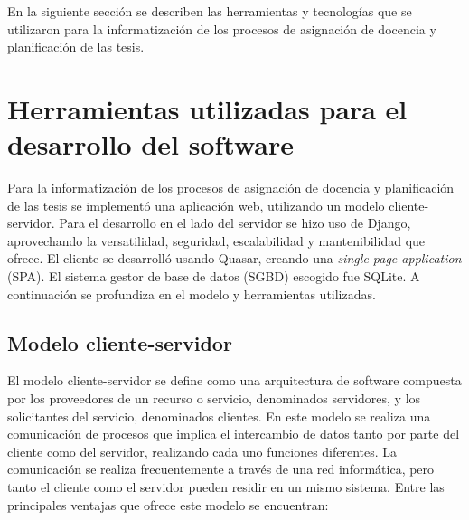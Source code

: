 






En la siguiente sección se describen las herramientas y tecnologías 
que se utilizaron para la informatización de los procesos de asignación de 
docencia y planificación de las tesis.



\section{Herramientas utilizadas para el desarrollo del software}\label{herramientas:cap1}
Para la informatización de los procesos
de asignación de docencia y planificación de las tesis
se implementó una aplicación web,
utilizando un modelo cliente-servidor.
Para el desarrollo en el lado del servidor se hizo uso de Django, aprovechando la
versatilidad, seguridad, escalabilidad y mantenibilidad
que ofrece.
El cliente se desarrolló usando Quasar, creando una
\textit{single-page application} (SPA).
El sistema gestor de base de datos (SGBD) escogido fue SQLite.
A continuación se profundiza en el modelo 
y herramientas utilizadas.



\subsection{Modelo cliente-servidor}

El modelo cliente-servidor se define como una arquitectura
de software compuesta por los proveedores de un recurso o servicio, 
denominados servidores, y los solicitantes del servicio, denominados
clientes. En este modelo se realiza una comunicación de procesos
que implica el intercambio de datos tanto por parte del cliente 
como del servidor, realizando cada uno funciones diferentes. La comunicación
se realiza frecuentemente a través de una red informática, pero 
tanto el cliente como el servidor pueden residir en un mismo sistema.
Entre las principales ventajas que ofrece este modelo se encuentran:

